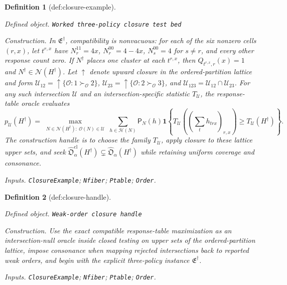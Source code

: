 \documentclass{article}
\newtheorem{definition}{Definition}
\begin{document}
\begin{definition}[def:closure-example]\label{def:closure-example}
\par\smallskip\noindent\emph{Defined object.} \texttt{Worked three-\allowbreak{}policy closure test bed}
\par\smallskip\noindent\emph{Construction.} In \(\mathfrak E^\dagger\), compatibility is nonvacuous: for each of the six nonzero cells \((r,x)\), let \(t^{r,x}\) have \(N_r^{11}=4x\), \(N_r^{00}=4-4x\), \(N_s^{00}=4\) for \(s\ne r\), and every other response count zero. If \(N^\dagger\) places one cluster at each \(t^{r,x}\), then \(Q_{t^{r,x},r}(x)=1\) and \(N^\dagger\in\mathcal N(H^\dagger)\). Let \(\uparrow\) denote upward closure in the ordered-partition lattice and form \(\mathcal U_{12}=\uparrow\{\mathcal O:1\succ_{\mathcal O}2\}\), \(\mathcal U_{23}=\uparrow\{\mathcal O:2\succ_{\mathcal O}3\}\), and \(\mathcal U_{123}=\mathcal U_{12}\cap\mathcal U_{23}\). For any such intersection \(\mathcal U\) and an intersection-specific statistic \(T_{\mathcal U}\), the response-table oracle evaluates \[p_{\mathcal U}(H^\dagger)=\max_{\substack{N\in\mathcal N(H^\dagger)\colon\ \mathcal O(N)\in\mathcal U}}\sum_{h\in\mathcal H(N)}\mathsf P_N(h)\mathbf 1\!\left\{T_{\mathcal U}((\sum_t h_{trx})_{r,x})\ge T_{\mathcal U}(H^\dagger)\right\}.\] The construction handle is to choose the family \(T_{\mathcal U}\), apply closure to these lattice upper sets, and seek \(\widehat{\mathfrak O}^{\mathrm{cl}}_{\alpha}(H^\dagger)\subsetneq\widehat{\mathfrak O}_{\alpha}(H^\dagger)\) while retaining uniform coverage and consonance.
\par\smallskip\noindent\emph{Inputs.} \texttt{ClosureExample}; \texttt{Nfiber}; \texttt{Ptable}; \texttt{Order}.
\end{definition}

\begin{definition}[def:closure-handle]\label{def:closure-handle}
\par\smallskip\noindent\emph{Defined object.} \texttt{Weak-\allowbreak{}order closure handle}
\par\smallskip\noindent\emph{Construction.} Use the exact compatible response-table maximization as an intersection-null oracle inside closed testing on upper sets of the ordered-partition lattice, impose consonance when mapping rejected intersections back to reported weak orders, and begin with the explicit three-policy instance \(\mathfrak E^\dagger\).
\par\smallskip\noindent\emph{Inputs.} \texttt{ClosureExample}; \texttt{Nfiber}; \texttt{Ptable}; \texttt{Order}.
\end{definition}
\end{document}
